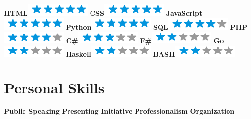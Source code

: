 \documentclass[]{friggeri-cv}
\begin{document}
\begin{aside}
    \textbf{HTML}\includegraphics[scale=0.40]{img/5stars.png}
    \textbf{CSS}\includegraphics[scale=0.40]{img/5stars.png}
    \textbf{JavaScript}\includegraphics[scale=0.40]{img/5stars.png}
    \textbf{Python}\includegraphics[scale=0.40]{img/5stars.png}
     \textbf{SQL}\includegraphics[scale=0.40]{img/4stars.png}
     \textbf{PHP}\includegraphics[scale=0.40]{img/4stars.png}
     \textbf{C\#}\includegraphics[scale=0.40]{img/3stars.png}
     \textbf{F\#}\includegraphics[scale=0.40]{img/2stars.png}
	 \textbf{Go}\includegraphics[scale=0.40]{img/2stars.png}
	 \textbf{Haskell}\includegraphics[scale=0.40]{img/2stars.png}
	  \textbf{BASH}\includegraphics[scale=0.40]{img/2stars.png}
    ~
  \section{Personal Skills}
    \textbf{Public Speaking}
    \textbf{Presenting}
    \textbf{Initiative}
    \textbf{Professionalism}
    \textbf{Organization}
    ~
\end{aside}
\end{document}
